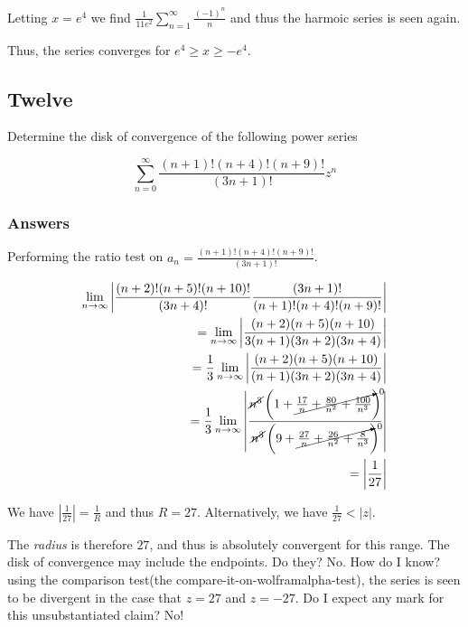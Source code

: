 \documentclass{article}
\begin{document}
Letting $x = e^4$ we find $\frac{1}{11e^2} \sum_{n=1}^{\infty} \frac{(-1)^n}{n}$ and thus the harmoic series is seen again.

Thus, the series converges for $e^4 \geq x \geq -e^4$.
\par

\subsection*{Twelve}

Determine the disk of convergence of the following power series

\begin{equation}\label{c12}
\sum_{n=0}^{\infty} \frac {(n+1)!(n+4)!(n+9)!}{(3n+1)!}z^n
\end{equation}

\subsubsection*{Answers}

Performing the ratio test on $a_n = \frac {(n+1)!(n+4)!(n+9)!}{(3n+1)!}$.

\begin{align*}
\lim_{n\to\infty}\left| \frac{(n+2)!(n+5)!(n+10)!}{(3n+4)!} \frac{(3n+1)!}{(n+1)!(n+4)!(n+9)!} \right| \\
= \lim_{n\to\infty}\left| \frac{(n+2)(n+5)(n+10)}{3(n+1)(3n+2)(3n+4)}\right| \\
= \frac{1}{3} \lim_{n\to\infty}\left| \frac{(n+2)(n+5)(n+10)}{(n+1)(3n+2)(3n+4)} \right|\\
= \frac{1}{3} \lim_{n\to\infty}\left| \frac{\cancel{n^3}\left(1+\cancelto{0}{\frac{17}{n}+\frac{80}{n^2}+\frac{100}{n^3}} \right) }{\cancel{n^3}\left(9+\cancelto{0}{\frac{27}{n}+\frac{26}{n^2}+\frac{8}{n^3}}\right)}\right| \\
= \left|\frac{1}{27}\right|
\end{align*}

We have $\left|\frac{1}{27}\right| = \frac{1}{R}$ and thus $R = 27$. Alternatively, we have $\frac{1}{27} < \left|z\right|$.

The \textit{radius} is therefore $27$, and thus is absolutely convergent for this range.
The disk of convergence may include the endpoints. Do they? No. How do I know? using the comparison test(the compare-it-on-wolframalpha-test), the series is seen to be divergent in the case that $z = 27$ and $z = -27$. Do I expect any mark for this unsubstantiated claim? No!
\end{document}
